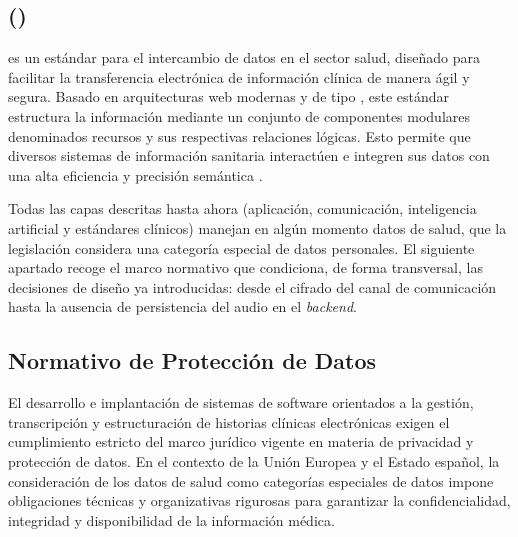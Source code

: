\subsection{ ()}\label{subsection:hl7_fhir}

 es un estándar para el intercambio de datos en el sector salud, 
diseñado para facilitar la transferencia electrónica de información clínica de manera ágil y segura. Basado
en arquitecturas web modernas y  de tipo , este estándar estructura la 
información mediante un conjunto de componentes modulares denominados recursos y sus respectivas relaciones lógicas. 
Esto permite que diversos sistemas de información sanitaria interactúen e integren sus datos con una alta eficiencia y 
precisión semántica \cite{sanidad2023}.\cite{sanidad2023}

Todas las capas descritas hasta ahora (aplicación, comunicación, inteligencia artificial y
estándares clínicos) manejan en algún momento datos de salud, que la legislación considera una
categoría especial de datos personales. El siguiente apartado recoge el marco normativo que
condiciona, de forma transversal, las decisiones de diseño ya introducidas: desde el cifrado
 del canal de comunicación hasta la ausencia de persistencia del audio en el
\textit{backend}.

\subsection{Normativo de Protección de Datos}

El desarrollo e implantación de sistemas de software orientados a la gestión, transcripción y estructuración
de historias clínicas electrónicas exigen el cumplimiento estricto del marco jurídico vigente en materia de
privacidad y protección de datos. En el contexto de la Unión Europea y el Estado español, la consideración de
los datos de salud como categorías especiales de datos impone obligaciones técnicas y organizativas rigurosas
para garantizar la confidencialidad, integridad y disponibilidad de la información médica.

